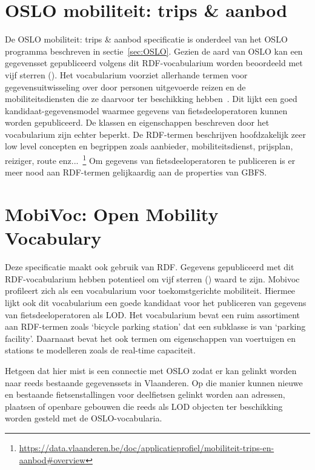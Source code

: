 \section{OSLO mobiliteit: trips \& aanbod}
\label{sec:trips&aanbod}
De OSLO mobiliteit: trips \& aanbod specificatie is onderdeel van het OSLO programma beschreven in sectie~\ref{sec:OSLO}. Gezien de aard van OSLO kan een gegevensset gepubliceerd volgens dit RDF-vocabularium worden beoordeeld met vijf sterren (\ast \ast \ast \ast \ast). Het vocabularium voorziet allerhande termen voor gegevensuitwisseling over door personen uitgevoerde reizen en de mobiliteitsdiensten die ze daarvoor ter beschikking hebben~\cite{oslomobiliteit}. Dit lijkt een goed kandidaat-gegevensmodel waarmee gegevens van fietsdeeloperatoren kunnen worden gepubliceerd. De klassen en eigenschappen beschreven door het vocabularium zijn echter beperkt. De RDF-termen beschrijven hoofdzakelijk zeer low level concepten en begrippen zoals aanbieder, mobiliteitsdienst, prijsplan, reiziger, route enz...~\footnote{\url{https://data.vlaanderen.be/doc/applicatieprofiel/mobiliteit-trips-en-aanbod\#overview}} Om gegevens van fietsdeeloperatoren te publiceren is er meer nood aan RDF-termen gelijkaardig aan de properties van GBFS.

\section{MobiVoc: Open Mobility Vocabulary}
\label{sec:mobivoc}
Deze specificatie maakt ook gebruik van RDF. Gegevens gepubliceerd met dit RDF-vocabularium hebben potentieel om vijf sterren (\ast \ast \ast \ast \ast) waard te zijn. Mobivoc profileert zich als een vocabularium voor toekomstgerichte mobiliteit. Hiermee lijkt ook dit vocabularium een goede kandidaat voor het publiceren van gegevens van fietsdeeloperatoren als LOD. Het vocabularium bevat een ruim assortiment aan RDF-termen zoals `bicycle parking station' dat een subklasse is van `parking facility'. Daarnaast bevat het ook termen om eigenschappen van voertuigen en stations te modelleren zoals de real-time capaciteit. 

Hetgeen dat hier mist is een connectie met OSLO zodat er kan gelinkt worden naar reeds bestaande gegevenssets in Vlaanderen. Op die manier kunnen nieuwe en bestaande fietsenstallingen voor deelfietsen gelinkt worden aan adressen, plaatsen of openbare gebouwen die reeds als LOD objecten ter beschikking worden gesteld met de OSLO-vocabularia. 